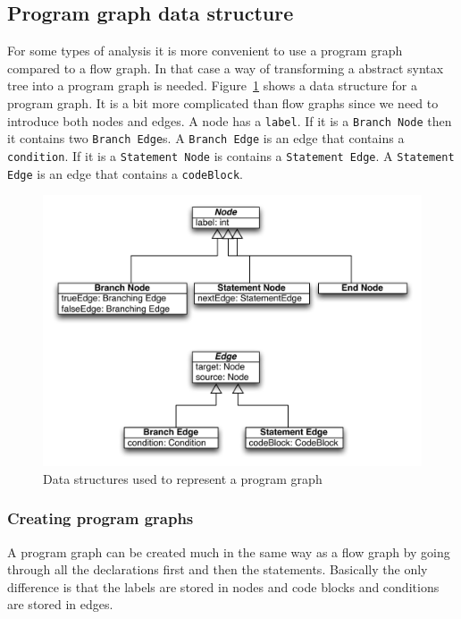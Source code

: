 \subsection{Program graph data structure}
For some types of analysis it is more convenient to use a program graph compared to a flow graph. In that case a way of transforming a abstract syntax tree into a program graph is needed. Figure~\ref{fig:programgraph} shows a data structure for a program graph. It is a bit more complicated than flow graphs since we need to introduce both nodes and edges. A node has a \texttt{label}. If it is a \texttt{Branch Node} then it contains two \texttt{Branch Edge}s. A \texttt{Branch Edge} is an edge that contains a \texttt{condition}. If it is a \texttt{Statement Node} is contains a \texttt{Statement Edge}. A \texttt{Statement Edge} is an edge that contains a \texttt{codeBlock}.

\begin{figure}[h]
	\centering
	\includegraphics[scale=1.0]{../img/program_graph}
	\caption{Data structures used to represent a program graph}
	\label{fig:programgraph}
\end{figure}

\subsubsection{Creating program graphs}
A program graph can be created much in the same way as a flow graph by going through all the declarations first and then the statements. Basically the only difference is that the labels are stored in nodes and code blocks and conditions are stored in edges.
